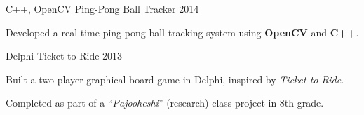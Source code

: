 \begin{cventries}
  \cventry
    {C++, OpenCV} %
    {Ping-Pong Ball Tracker} %
    {} %
    {2014} %
    {
      \begin{cvitems} %
        \item {Developed a real-time ping-pong ball tracking system using \textbf{OpenCV} and \textbf{C++}.}
      \end{cvitems}
    }

  \cventry
    {Delphi} %
    {Ticket to Ride} %
    {} %
    {2013} %
    {
      \begin{cvitems} %
       \item {Built a two-player graphical board game in Delphi, inspired by \textit{Ticket to Ride}.}
      \item {Completed as part of a “\emph{Pajooheshi}” (research) class project in 8th grade.}
      \end{cvitems}
    }

\end{cventries}
